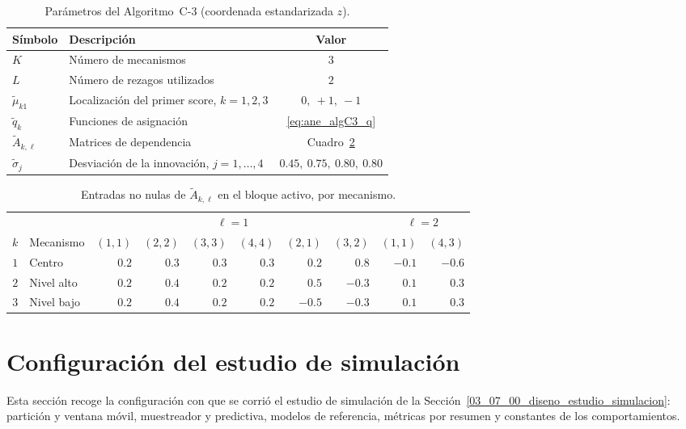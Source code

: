 \begin{table}[H]
\centering
\caption{Parámetros del Algoritmo~C-3 (coordenada estandarizada $z$).}
\label{tab:ane_algC3}
\begin{tabular}{llc}
\hline
Símbolo & Descripción & Valor \\
\hline
$K$                  & Número de mecanismos                                   & $3$ \\
$L$                  & Número de rezagos utilizados                           & $2$ \\
$\tilde\mu_{k1}$     & Localización del primer score, $k=1,2,3$               & $0,\ +1,\ -1$ \\
$\tilde q_k$         & Funciones de asignación                                & \eqref{eq:ane_algC3_q} \\
$\tilde A_{k,\ell}$  & Matrices de dependencia                                & Cuadro~\ref{tab:ane_algC3_mecanismos} \\
$\tilde\sigma_j$     & Desviación de la innovación, $j=1,\ldots,4$            & $0.45,\ 0.75,\ 0.80,\ 0.80$ \\
\hline
\end{tabular}
\end{table}

\begin{table}[H]
\centering
\caption{Entradas no nulas de $\tilde A_{k,\ell}$ en el bloque activo, por mecanismo.}
\label{tab:ane_algC3_mecanismos}
\small\setlength{\tabcolsep}{4pt}
\begin{tabular}{clrrrrrrrr}
\hline
 & & \multicolumn{6}{c}{$\ell=1$} & \multicolumn{2}{c}{$\ell=2$} \\
$k$ & Mecanismo & $(1,1)$ & $(2,2)$ & $(3,3)$ & $(4,4)$ & $(2,1)$ & $(3,2)$ & $(1,1)$ & $(4,3)$ \\
\hline
$1$ & Centro      & $0.2$ & $0.3$ & $0.3$ & $0.3$ & $0.2$  & $0.8$  & $-0.1$ & $-0.6$ \\
$2$ & Nivel alto  & $0.2$ & $0.4$ & $0.2$ & $0.2$ & $0.5$  & $-0.3$ & $0.1$  & $0.3$ \\
$3$ & Nivel bajo  & $0.2$ & $0.4$ & $0.2$ & $0.2$ & $-0.5$ & $-0.3$ & $0.1$  & $0.3$ \\
\hline
\end{tabular}
\end{table}

\section{Configuración del estudio de simulación}
\label{ane_00_03_configuracion}
Esta sección recoge la configuración con que se corrió el estudio de simulación de la Sección~\ref{03_07_00_diseno_estudio_simulacion}: partición y ventana móvil, muestreador y predictiva, modelos de referencia, métricas por resumen y constantes de los comportamientos.\\


